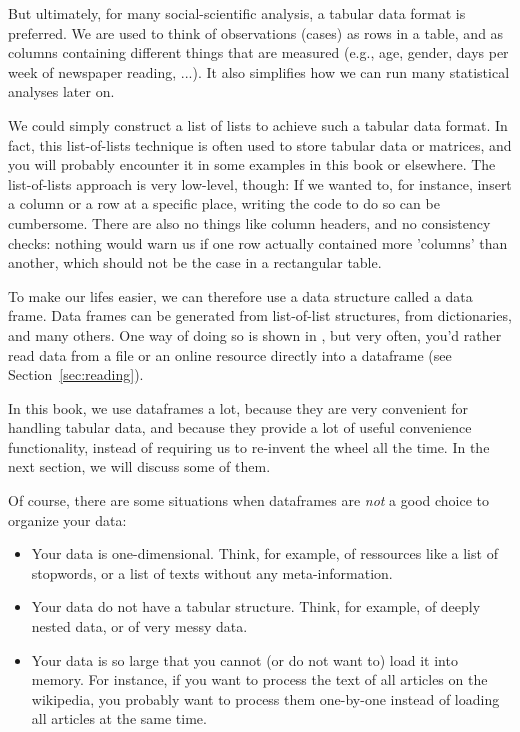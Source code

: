 But ultimately, for many social-scientific analysis, a tabular data format is preferred. We are used to think of observations (cases) as rows in a table, and as columns containing different things that are measured (e.g., age, gender, days per week of newspaper reading, ...). It also simplifies how we can run many statistical analyses later on.

We could simply construct a list of lists to achieve such a tabular data format.
In fact, this list-of-lists technique is often used to store tabular data or matrices, and you will probably encounter it in some examples in this book or elsewhere. The list-of-lists approach is very low-level, though: If we wanted to, for instance, insert a column or a row at a specific place, writing the code to do so can be cumbersome. There are also no things like column headers, and no consistency checks: nothing would warn us if one row actually contained more 'columns' than another, which should not be the case in a rectangular table.

To make our lifes easier, we can therefore use a data structure called a data frame. 
Data frames can be generated from list-of-list structures, from dictionaries, and many others.
One way of doing so is shown in , but very often, you'd rather read data from a file or an online resource directly into a dataframe (see Section~\ref{sec:reading}).


In this book, we use dataframes a lot, because they are very convenient for handling tabular data, and because they provide a lot of useful convenience functionality, instead of requiring us to re-invent the wheel all the time. In the next section, we will discuss some of them.

Of course, there are some situations when dataframes are \emph{not} a good choice to organize your data:
\begin{itemize}
\item Your data is one-dimensional. Think, for example, of ressources like a list of stopwords, or a list of texts without any meta-information.
\item Your data do not have a tabular structure. Think, for example, of deeply nested data, or of very messy data.
\item Your data is so large that you cannot (or do not want to) load it into memory. For instance, if you want to process the text of all articles on the wikipedia, you probably want to process them one-by-one instead of loading all articles at the same time.
\end{itemize}

